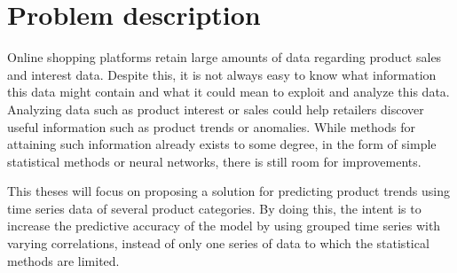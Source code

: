 
\section{Problem description}
\label{section:Introduction:ProblemDescription}
Online shopping platforms retain large amounts of data regarding product sales and interest data.
Despite this, it is not always easy to know what information this data might contain and what it could mean to exploit and analyze this data.
Analyzing data such as product interest or sales could help retailers discover useful information such as product trends or anomalies.
While methods for attaining such information already exists to some degree, in the form of simple statistical methods or neural networks,
there is still room for improvements.


This theses will focus on proposing a solution for predicting product trends using time series data of several product categories.
By doing this, the intent is to increase the predictive accuracy of the model by using grouped time series with varying correlations,
instead of only one series of data to which the statistical methods are limited.


